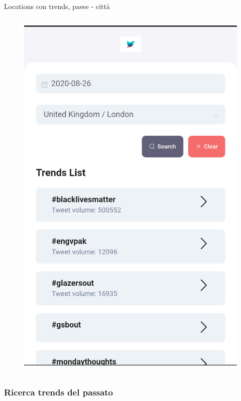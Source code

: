 \documentclass[xcolor=svgnames, aspectratio=169]{beamer}
\begin{document}
\begin{frame}{Locations con trends, paese - città}
\begin{columns}[t]
        \begin{figure}[H]
            \centering
            \includegraphics[width=0.32\paperwidth,height=0.7\paperheight,keepaspectratio]{Mobile_Chrome_Ricerca_trends_a_Londra_26_agosto.jpg}
        \end{figure}
    \end{columns}
\end{frame}


\subsubsection{Ricerca trends del passato}
\end{document}
